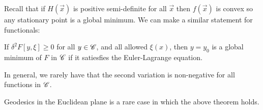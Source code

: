 \documentclass[../Main.tex]{subfiles}
\begin{document}
Recall that if $H(\vec{x})$ is positive semi-definite for all $\vec{x}$ then $f(\vec{x})$ is convex so any stationary point is a global minimum. We can make a similar statement for functionals:
\begin{theorem}
    If $\delta^2 F[y, \xi] \geq 0$ for all $y \in \mathscr{C}$, and all allowed $\xi(x)$, then $y = y_0$ is a global minimum of $F$ in $\mathscr{C}$ if it satiesfies the Euler-Lagrange equation.
\end{theorem}
\begin{remark}
    In general, we rarely have that the second variation is non-negative for all functions in $\mathscr{C}$.
\end{remark}
\begin{example}
    Geodesics in the Euclidean plane is a rare case in which the above theorem holds.
\end{example}
\end{document}
